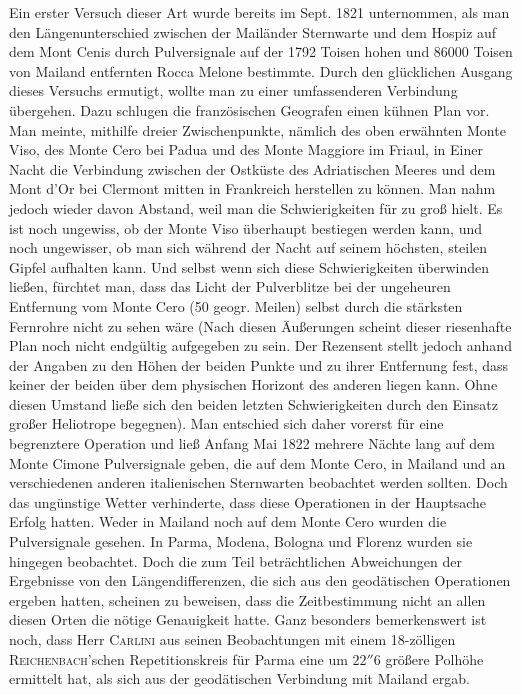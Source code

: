 Ein erster Versuch dieser Art wurde bereits im Sept. 1821 unternommen, als man den Längenunterschied zwischen der Mailänder Sternwarte und dem Hospiz auf dem Mont Cenis durch Pulversignale auf der 1792 Toisen hohen und 86000 Toisen von Mailand entfernten Rocca Melone bestimmte.
Durch den glücklichen Ausgang dieses Versuchs ermutigt, wollte man zu einer
 umfassenderen Verbindung übergehen.
Dazu schlugen die französischen Geografen einen kühnen Plan vor. Man meinte, mithilfe dreier Zwischenpunkte, nämlich des oben erwähnten Monte Viso, des Monte Cero bei Padua und des Monte Maggiore im Friaul, in Einer Nacht die Verbindung zwischen der Ostküste des Adriatischen Meeres und dem Mont d'Or bei Clermont mitten in Frankreich herstellen zu können.
Man nahm jedoch wieder davon Abstand, weil man die Schwierigkeiten für zu groß hielt.
Es ist noch ungewiss, ob der Monte Viso überhaupt bestiegen werden kann, und noch ungewisser, ob man sich während der Nacht auf seinem höchsten, steilen Gipfel aufhalten kann.
Und selbst wenn sich diese Schwierigkeiten überwinden ließen, fürchtet man, dass das Licht der Pulverblitze bei der ungeheuren Entfernung vom Monte Cero (50 geogr. Meilen) selbst durch die stärksten Fernrohre nicht zu sehen wäre
(Nach diesen Äußerungen scheint dieser riesenhafte Plan noch nicht endgültig aufgegeben zu sein. Der Rezensent stellt jedoch anhand der Angaben zu den Höhen der beiden Punkte und zu ihrer Entfernung fest, dass keiner der beiden über dem physischen Horizont des anderen liegen kann. Ohne diesen Umstand ließe sich den beiden letzten Schwierigkeiten durch den Einsatz großer Heliotrope begegnen).
Man entschied sich daher vorerst für eine begrenztere Operation und ließ Anfang Mai 1822 mehrere Nächte lang auf dem Monte Cimone Pulversignale geben, die auf dem Monte Cero, in Mailand und an verschiedenen anderen italienischen Sternwarten beobachtet werden sollten.
Doch das ungünstige Wetter verhinderte, dass diese Operationen in der Hauptsache Erfolg hatten. Weder in Mailand noch auf dem Monte Cero wurden die Pulversignale gesehen.
In Parma, Modena, Bologna und Florenz wurden sie hingegen beobachtet. Doch die zum Teil beträchtlichen Abweichungen der Ergebnisse von den Längendifferenzen, die sich aus den geodätischen Operationen ergeben hatten, scheinen zu beweisen, dass die Zeitbestimmung nicht an allen diesen Orten die nötige Genauigkeit hatte.
Ganz besonders bemerkenswert ist noch, dass Herr \textsc{Carlini} aus seinen Beobachtungen mit einem 18-zölligen \textsc{Reichenbach}'schen Repetitionskreis für Parma eine um $22''6$ größere Polhöhe ermittelt hat, als sich aus der geodätischen Verbindung mit Mailand ergab.
